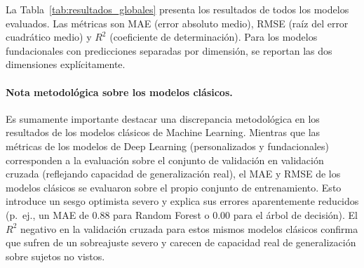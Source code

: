 \documentclass[12pt, a4paper]{article}
\begin{document}
La Tabla~\ref{tab:resultados_globales} presenta los resultados de todos los modelos evaluados. Las métricas son MAE (error absoluto medio), RMSE (raíz del error cuadrático medio) y $R^2$ (coeficiente de determinación). Para los modelos fundacionales con predicciones separadas por dimensión, se reportan las dos dimensiones explícitamente.

\paragraph{Nota metodológica sobre los modelos clásicos.}
Es sumamente importante destacar una discrepancia metodológica en los resultados de los modelos clásicos de Machine Learning. Mientras que las métricas de los modelos de Deep Learning (personalizados y fundacionales) corresponden a la evaluación sobre el conjunto de validación en validación cruzada (reflejando capacidad de generalización real), el MAE y RMSE de los modelos clásicos se evaluaron sobre el propio conjunto de entrenamiento. Esto introduce un sesgo optimista severo y explica sus errores aparentemente reducidos (p.~ej., un MAE de 0.88 para Random Forest o 0.00 para el árbol de decisión). El $R^2$ negativo en la validación cruzada para estos mismos modelos clásicos confirma que sufren de un sobreajuste severo y carecen de capacidad real de generalización sobre sujetos no vistos.
\end{document}
